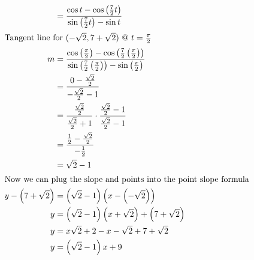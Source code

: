 \documentclass[12pt]{article}
\begin{document}
\begin{align}
                            & =\frac{\cos t-\cos\left(\frac{7}{2}t\right)}{\sin\left(\frac{7}{2}t\right)-\sin t}                                                                                                   \\
  \intertext{Tangent line for $(-\sqrt{2},7+\sqrt{2})$ @ $t=\frac{\pi}{2}$}
  m                         & =\frac{\cos\left(\frac{\pi}{2}\right)-\cos\left(\frac{7}{2}\left(\frac{\pi}{2}\right)\right)}{\sin\left(\frac{7}{2}\left(\frac{\pi}{2}\right)\right)-\sin\left(\frac{\pi}{2}\right)} \\
                            & =\frac{0-\frac{\sqrt{2}}{2}}{-\frac{\sqrt{2}}{2}-1}                                                                                                                                  \\
                            & =\frac{\frac{\sqrt{2}}{2}}{\frac{\sqrt{2}}{2}+1}\cdot\frac{\frac{\sqrt{2}}{2}-1}{\frac{\sqrt{2}}{2}-1}                                                                               \\
                            & =\frac{\frac{1}{2}-\frac{\sqrt{2}}{2}}{-\frac{1}{2}}                                                                                                                                 \\
                            & =\sqrt{2}-1                                                                                                                                                                          \\
  \intertext{Now we can plug the slope and points into the point slope formula}
  y-\left(7+\sqrt{2}\right) & =\left(\sqrt{2}-1\right)\left(x-\left(-\sqrt{2}\right)\right)                                                                                                                        \\
  y                         & =\left(\sqrt{2}-1\right)\left(x+\sqrt{2}\right)+\left(7+\sqrt{2}\right)                                                                                                              \\
  y                         & =x\sqrt{2}+2-x-\sqrt{2}+7+\sqrt{2}                                                                                                                                                   \\
  y                         & =\left(\sqrt{2}-1\right)x+9                                                                                                                                                          \\

\end{align}
\end{document}

